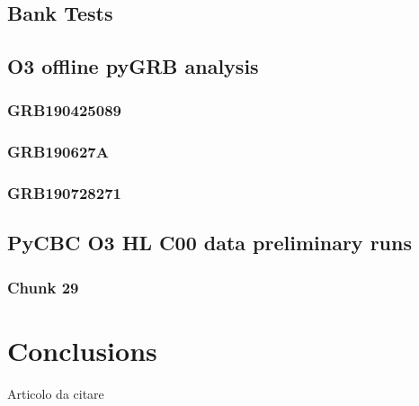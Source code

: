 \documentclass[binding=0.6cm, LaM]{sapthesis}
\begin{document}
\section{Bank Tests}

\section{O3 offline pyGRB analysis}

\subsection{GRB190425089}

\subsection{GRB190627A}

\subsection{GRB190728271}

\section{PyCBC O3 HL C00 data preliminary runs}

\subsection{Chunk 29}

\chapter{Conclusions}

\cite[]{1}
\backmatter
\cleardoublepage


\begin{thebibliography}{100}
    Articolo da citare
\end{thebibliography}

\printbibliography
\end{document}
